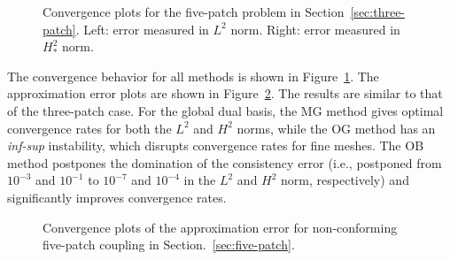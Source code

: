 \begin{figure}[ht]
	\centering
	\begin{subfigure}[b]{0.47\textwidth}
		
	\end{subfigure}
	\hfill
	\begin{subfigure}[b]{0.47\textwidth}
		
	\end{subfigure}

	\begin{subfigure}[b]{0.47\textwidth}
		
	\end{subfigure}
	\hfill
	\begin{subfigure}[b]{0.47\textwidth}
		
	\end{subfigure}
	\caption{Convergence plots for the five-patch problem in Section~\ref{sec:three-patch}. Left: error measured in $L^2$ norm. Right: error measured in $H^2_*$ norm.}\label{fig:five_patc_biharmonic_convergence}
\end{figure}

The convergence behavior for all methods is shown in Figure~\ref{fig:five_patc_biharmonic_convergence}. The approximation error plots are shown in Figure~\ref{fig:five_patch_approximation}. The results are similar to that of the three-patch case. For the global dual basis, the MG method gives optimal convergence rates for both the $L^2$ and $H^2$ norms, while the OG method has an \textit{inf-sup} instability, which disrupts convergence rates for fine meshes. The OB method postpones the domination of the consistency error (i.e., postponed from $10^{-3}$ and $10^{-1}$ to $10^{-7}$ and $10^{-4}$ in the $L^2$ and $H^2$ norm, respectively) and significantly improves convergence rates.

\begin{figure}[ht]
	\centering
	\begin{subfigure}[b]{0.47\textwidth}
		
	\end{subfigure}
	\hfill
	\begin{subfigure}[b]{0.47\textwidth}
		
	\end{subfigure}
	\caption{Convergence plots of the approximation error for non-conforming five-patch coupling in Section.~\ref{sec:five-patch}.}\label{fig:five_patch_approximation}
\end{figure}
\FloatBarrier

